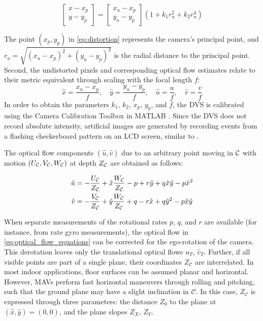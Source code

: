 \begin{equation}
\label{eq:distortion}
{\left[ {\begin{array}{*{20}{c}}
		{{x-x_p}}\\{{y-y_p}}
		\end{array}} \right]} = {\left[ {\begin{array}{*{20}{c}}
		x_u-x_p\\y_u-y_p
		\end{array}} \right]}\left( {1 + {k_1}{r_u^2} + {k_2}{r_u^4}} \right)
\end{equation}

The point $\left(x_p,y_p\right)$ in \cref{eq:distortion} represents the camera's principal point, and $r_u=\sqrt{\left(x_u-x_p\right)^2+\left(y_u-y_p\right)^2}$ is the radial distance to the principal point. Second, the undistorted pixels and corresponding optical flow estimates relate to their metric equivalent through scaling with the focal length $f$:
\begin{equation}
\hat x = \frac{{x_u - {x_p}}}{f},\quad \hat y = \frac{{y_u - {y_p}}}{f},\quad \hat u = \frac{u}{f},\quad \hat v = \frac{v}{f}
\end{equation}
In order to obtain the parameters $k_1$, $k_2$, $x_p$, $y_p$, and $f$, the DVS is calibrated using the Camera Calibration Toolbox in MATLAB \cite{Bouguet1999}. Since the DVS does not record absolute intensity, artificial images are generated by recording events from a flashing checkerboard pattern on an LCD screen, similar to \citet{Mueggler2014}.

The optical flow components $\left(\hat{u},\hat{v}\right)$ due to an arbitrary point moving in $\cal C$ with motion $\left(U_{\cal C},V_{\cal C}, W_{\cal C}\right)$ at depth $Z_{\cal C}$ are obtained as follows:

\begin{equation}
\label{eq:optical_flow_equations}
\begin{aligned}
\hat u &=  - \frac{{{U_{\cal C}}}}{{{Z_{\cal C}}}} + \hat x\frac{{{W_{\cal C}}}}{{{Z_{\cal C}}}} - p + r\hat y + q\hat x\hat y - p{{\hat x}^2}\\
\hat v &=  - \frac{{{V_{\cal C}}}}{{{Z_{\cal C}}}} + \hat y\frac{{{W_{\cal C}}}}{{{Z_{\cal C}}}} + q - r\hat x + q{{\hat y}^2} - p\hat x\hat y
\end{aligned}
\end{equation}

When separate measurements of the rotational rates $p$, $q$, and $r$ are available (for instance, from rate gyro measurements), the optical flow in \cref{eq:optical_flow_equations} can be corrected for the ego-rotation of the camera. This derotation leaves only the translational optical flows $\hat u_T$, $\hat v_T$. Further, if all visible points are part of a single plane, their coordinates $Z_\mathcal{C}$ are interrelated. In most indoor applications, floor surfaces can be assumed planar and horizontal. However, MAVs perform fast horizontal maneuvers through rolling and pitching, such that the ground plane may have a slight inclination in $\mathcal{C}$. In this case, $Z_\mathcal{C}$ is expressed through three parameters: the distance $Z_0$ to the plane at $\left(\hat{x},\hat{y}\right)=\left(0,0\right)$, and the plane slopes ${Z_X}$, ${Z_Y}$. 

